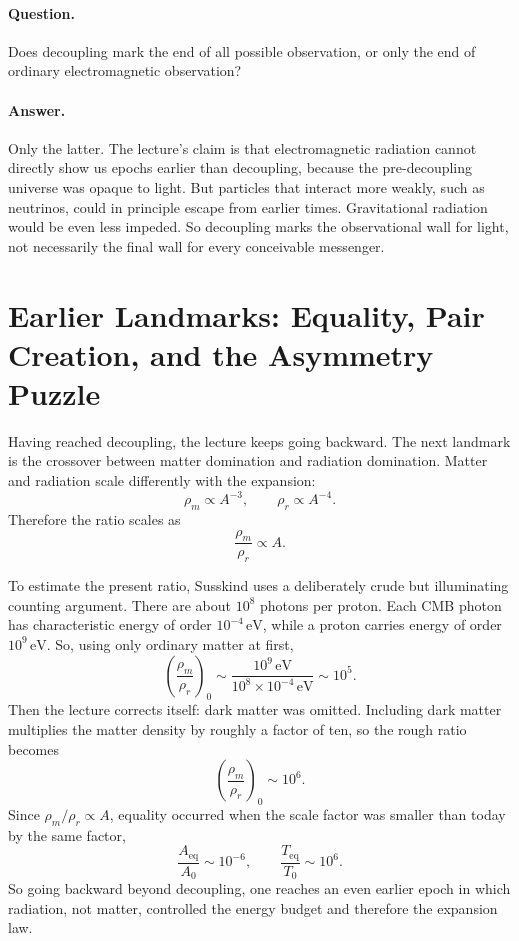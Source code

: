 \paragraph{Question.} Does decoupling mark the end of all possible observation, or only the end of ordinary electromagnetic observation?

\paragraph{Answer.} Only the latter. The lecture's claim is that electromagnetic radiation cannot directly show us epochs earlier than decoupling, because the pre-decoupling universe was opaque to light. But particles that interact more weakly, such as neutrinos, could in principle escape from earlier times. Gravitational radiation would be even less impeded. So decoupling marks the observational wall for light, not necessarily the final wall for every conceivable messenger.

\section{Earlier Landmarks: Equality, Pair Creation, and the Asymmetry Puzzle}

Having reached decoupling, the lecture keeps going backward. The next landmark is the crossover between matter domination and radiation domination. Matter and radiation scale differently with the expansion:
\begin{equation}
\rho_m \propto A^{-3},
\qquad
\rho_r \propto A^{-4}.
\end{equation}
Therefore the ratio scales as
\begin{equation}
\frac{\rho_m}{\rho_r} \propto A.
\end{equation}

To estimate the present ratio, Susskind uses a deliberately crude but illuminating counting argument. There are about \(10^8\) photons per proton. Each CMB photon has characteristic energy of order \(10^{-4}\,\mathrm{eV}\), while a proton carries energy of order \(10^9\,\mathrm{eV}\). So, using only ordinary matter at first,
\begin{equation}
\left(\frac{\rho_m}{\rho_r}\right)_0
\sim
\frac{10^9\,\mathrm{eV}}{10^8 \times 10^{-4}\,\mathrm{eV}}
\sim 10^5.
\end{equation}
Then the lecture corrects itself: dark matter was omitted. Including dark matter multiplies the matter density by roughly a factor of ten, so the rough ratio becomes
\begin{equation}
\left(\frac{\rho_m}{\rho_r}\right)_0 \sim 10^6.
\end{equation}
Since \(\rho_m/\rho_r \propto A\), equality occurred when the scale factor was smaller than today by the same factor,
\begin{equation}
\frac{A_{\mathrm{eq}}}{A_0} \sim 10^{-6},
\qquad
\frac{T_{\mathrm{eq}}}{T_0} \sim 10^6.
\end{equation}
So going backward beyond decoupling, one reaches an even earlier epoch in which radiation, not matter, controlled the energy budget and therefore the expansion law.

